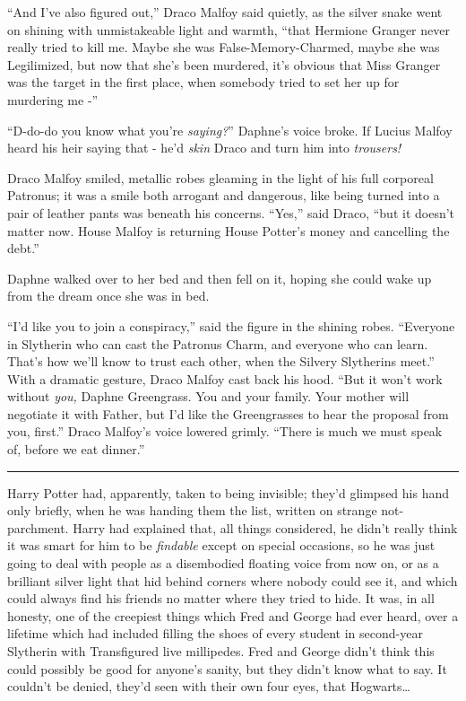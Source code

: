 ``And I've also figured out,'' Draco Malfoy said quietly, as the silver
snake went on shining with unmistakeable light and warmth, ``that
Hermione Granger never really tried to kill me. Maybe she was
False-Memory-Charmed, maybe she was Legilimized, but now that she's been
murdered, it's obvious that Miss Granger was the target in the first
place, when somebody tried to set her up for murdering me -''

``D-do-do you know what you're \emph{saying?}'' Daphne's voice broke. If
Lucius Malfoy heard his heir saying that - he'd \emph{skin} Draco and
turn him into \emph{trousers!}

Draco Malfoy smiled, metallic robes gleaming in the light of his full
corporeal Patronus; it was a smile both arrogant and dangerous, like
being turned into a pair of leather pants was beneath his concerns.
``Yes,'' said Draco, ``but it doesn't matter now. House Malfoy is
returning House Potter's money and cancelling the debt.''

Daphne walked over to her bed and then fell on it, hoping she could wake
up from the dream once she was in bed.

``I'd like you to join a conspiracy,'' said the figure in the shining
robes. ``Everyone in Slytherin who can cast the Patronus Charm, and
everyone who can learn. That's how we'll know to trust each other, when
the Silvery Slytherins meet.'' With a dramatic gesture, Draco Malfoy
cast back his hood. ``But it won't work without \emph{you,} Daphne
Greengrass. You and your family. Your mother will negotiate it with
Father, but I'd like the Greengrasses to hear the proposal from you,
first.'' Draco Malfoy's voice lowered grimly. ``There is much we must
speak of, before we eat dinner.''

\begin{center}\rule{3in}{0.4pt}\end{center}

Harry Potter had, apparently, taken to being invisible; they'd glimpsed
his hand only briefly, when he was handing them the list, written on
strange not-parchment. Harry had explained that, all things considered,
he didn't really think it was smart for him to be \emph{findable} except
on special occasions, so he was just going to deal with people as a
disembodied floating voice from now on, or as a brilliant silver light
that hid behind corners where nobody could see it, and which could
always find his friends no matter where they tried to hide. It was, in
all honesty, one of the creepiest things which Fred and George had ever
heard, over a lifetime which had included filling the shoes of every
student in second-year Slytherin with Transfigured live millipedes. Fred
and George didn't think this could possibly be good for anyone's sanity,
but they didn't know what to say. It couldn't be denied, they'd seen
with their own four eyes, that Hogwarts\ldots{}

